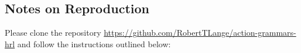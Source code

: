 \documentclass[colorinlistoftodos]{article}
\theoremstyle{definition}
\begin{document}


\subsection*{Notes on Reproduction}

Please clone the repository \url{https://github.com/RobertTLange/action-grammars-hrl} and follow the instructions outlined below:
\end{document}
